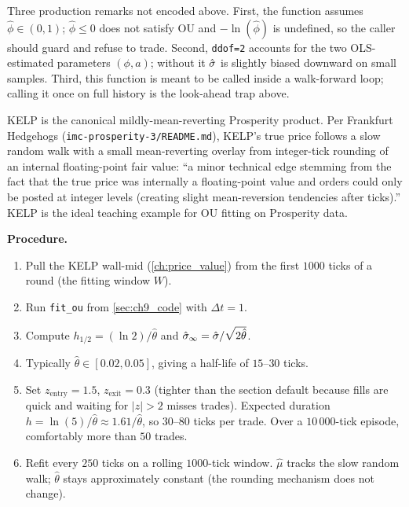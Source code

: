 Three production remarks not encoded above. First, the function
assumes $\hat\phi \in (0, 1)$; $\hat\phi \leq 0$ does not satisfy
OU and $-\ln(\hat\phi)$ is undefined, so the caller should guard
and refuse to trade. Second, \texttt{ddof=2} accounts for the
two OLS-estimated parameters $(\phi, a)$; without it
$\hat{\sigma}$ is slightly biased downward on small samples.
Third, this function is meant to be called inside a walk-forward
loop; calling it once on full history is the look-ahead trap
above.

\begin{prosperitybox}[title={Prosperity example: KELP}]
KELP is the canonical mildly-mean-reverting Prosperity product.
Per Frankfurt Hedgehogs
(\texttt{imc-prosperity-3/README.md}), KELP's true price follows
a slow random walk with a small mean-reverting overlay from
integer-tick rounding of an internal floating-point fair value:
``a minor technical edge stemming from the fact that the true
price was internally a floating-point value and orders could
only be posted at integer levels (creating slight mean-reversion
tendencies after ticks).'' KELP is the ideal teaching example
for OU fitting on Prosperity data.

\textbf{Procedure.}
\begin{enumerate}
  \item Pull the KELP wall-mid
  (\cref{ch:price_value}) from the first $1000$ ticks of a round
  (the fitting window $W$).
  \item Run \texttt{fit\_ou} from \cref{sec:ch9_code} with
  $\Delta t = 1$.
  \item Compute $h_{1/2} = (\ln 2)/\hat\theta$ and
  $\hat\sigma_\infty = \hat{\sigma}/\sqrt{2\hat\theta}$.
  \item Typically $\hat\theta \in [0.02, 0.05]$, giving a
  half-life of $15$--$30$ ticks.
  \item Set $z_{\text{entry}} = 1.5$, $z_{\text{exit}} = 0.3$
  (tighter than the section default because fills are quick and
  waiting for $|z| > 2$ misses trades). Expected duration
  $h = \ln(5)/\hat\theta \approx 1.61/\hat\theta$, so $30$--$80$
  ticks per trade. Over a $10\,000$-tick episode, comfortably
  more than $50$ trades.
  \item Refit every $250$ ticks on a rolling $1000$-tick window.
  $\hat\mu$ tracks the slow random walk; $\hat\theta$ stays
  approximately constant (the rounding mechanism does not change).
\end{enumerate}


\end{prosperitybox}
